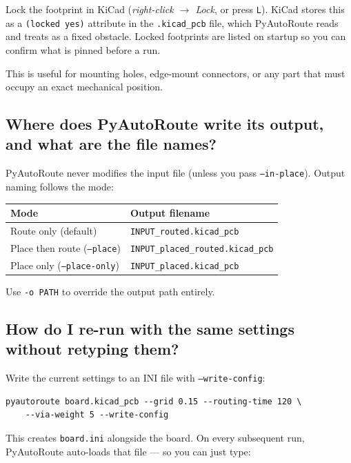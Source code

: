 \documentclass[11pt,a4paper]{article}
\begin{document}
Lock the footprint in KiCad (\emph{right-click $\to$ Lock}, or press
\texttt{L}). KiCad stores this as a \texttt{(locked yes)} attribute in
the \texttt{.kicad\_pcb} file, which PyAutoRoute reads and treats as a
fixed obstacle. Locked footprints are listed on startup so you can
confirm what is pinned before a run.

This is useful for mounting holes, edge-mount connectors, or any part
that must occupy an exact mechanical position.

\subsection*{Where does PyAutoRoute write its output, and what are the file names?}

PyAutoRoute never modifies the input file (unless you pass
\texttt{--in-place}). Output naming follows the mode:

\begin{center}
\begin{tabular}{ll}
    \toprule
    \textbf{Mode} & \textbf{Output filename} \\
    \midrule
    Route only (default)        & \texttt{INPUT\_routed.kicad\_pcb} \\
    Place then route (\texttt{--place})   & \texttt{INPUT\_placed\_routed.kicad\_pcb} \\
    Place only (\texttt{--place-only})    & \texttt{INPUT\_placed.kicad\_pcb} \\
    \bottomrule
\end{tabular}
\end{center}

Use \texttt{-o PATH} to override the output path entirely.

\subsection*{How do I re-run with the same settings without retyping them?}

Write the current settings to an INI file with \texttt{--write-config}:

\begin{lstlisting}
pyautoroute board.kicad_pcb --grid 0.15 --routing-time 120 \
    --via-weight 5 --write-config
\end{lstlisting}

This creates \texttt{board.ini} alongside the board. On every subsequent
run, PyAutoRoute auto-loads that file --- so you can just type:
\end{document}
